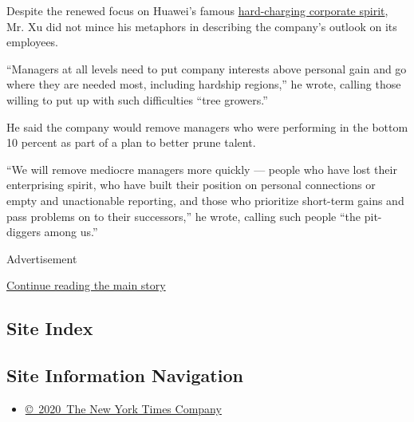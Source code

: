 Despite the renewed focus on Huawei's famous
\href{https://www.nytimes.com/2018/12/18/technology/huawei-workers-iran-sanctions.html}{hard-charging
corporate spirit}, Mr. Xu did not mince his metaphors in describing the
company's outlook on its employees.

``Managers at all levels need to put company interests above personal
gain and go where they are needed most, including hardship regions,'' he
wrote, calling those willing to put up with such difficulties ``tree
growers.''

He said the company would remove managers who were performing in the
bottom 10 percent as part of a plan to better prune talent.

``We will remove mediocre managers more quickly --- people who have lost
their enterprising spirit, who have built their position on personal
connections or empty and unactionable reporting, and those who
prioritize short-term gains and pass problems on to their successors,''
he wrote, calling such people ``the pit-diggers among us.''

Advertisement

\protect\hyperlink{after-bottom}{Continue reading the main story}

\hypertarget{site-index}{%
\subsection{Site Index}\label{site-index}}

\hypertarget{site-information-navigation}{%
\subsection{Site Information
Navigation}\label{site-information-navigation}}

\begin{itemize}
\tightlist
\item
  \href{https://help.nytimes.com/hc/en-us/articles/115014792127-Copyright-notice}{©~2020~The
  New York Times Company}
\end{itemize}

